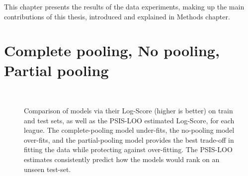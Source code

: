 This chapter presents the results of the data experiments, making up the main contributions of this thesis, introduced and explained in Methods chapter.

\section{Complete pooling, No pooling, Partial pooling} \label{results_1}

\begin{figure}
	 \\
	\caption{Comparison of models via their Log-Score (higher is better) on train and test sets, as well as the PSIS-LOO estimated Log-Score, for each league. The complete-pooling model under-fits, the no-pooling model over-fits, and the partial-pooling model provides the best trade-off in fitting the data while protecting against over-fitting. The PSIS-LOO estimates consistently predict how the models would rank on an unseen test-set.}
	\label{fig:log_scores}
\end{figure}

